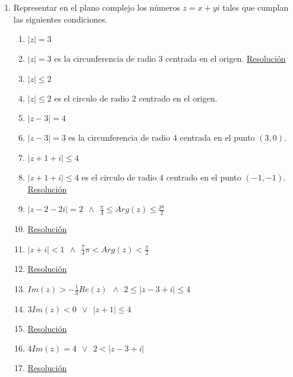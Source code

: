 \documentclass[a4paper]{article}
\newcommand{\answer}{\item[**]}
\newcommand{\exercise}{\item}
\newcommand{\df}[2]{\displaystyle\frac{#1}{#2}}
\begin{document}
\begin{enumerate}
\begin{enumerate} [label=(\alph*)]
		\item Dado $z=2e^{\beta i}$ y $w=1+i$, el argumento de $z.w$ será $\beta+\df{\pi}{4}$

		\item Si $z$ es un número real puro, entonces $z^2$ es un número real puro

	\end{enumerate}

	\exercise Representar en el plano complejo los números $z=x+yi$ tales que cumplan las siguientes condiciones.
	\begin{multicols}{2}
	\begin{enumerate} [label=(\alph*)]
		
		\item $|z|=3$
		\answer $|z|=3$ es la circunferencia de radio 3 centrada en el origen. \href{https://youtu.be/AQVEp9ncSwQ}{Resolución}

		\item $|z|\leq 2$
		\answer $|z|\leq 2$ es el circulo de radio 2 centrado en el origen.

		\item $|z-3| = 4$
		\answer $|z-3| = 3$ es la circunferencia de radio 4 centrada en el punto $(3,0)$.

		\item $|z+1+i| \leq 4$
		\answer $|z+1+i| \leq 4$ es el circulo de radio 4 centrado en el punto $(-1,-1)$. \href{https://youtu.be/Rj6VfY1fLzw}{Resolución}

		\item $|z-2-2i|=2 ~~\land~~ \df{\pi}{4} \leq Arg(z) \leq \df{pi}{2}$
		\answer \href{https://youtu.be/5OHpMCsd8iE}{Resolución}

		\item $|z+i|<1 ~~\land~~ \df{7}{4}\pi < Arg(z) < \df{\pi}{2}$
		\answer \href{https://youtu.be/OhXOvWcryMI}{Resolución}
		
		\item $Im(z)> -\df{1}{3}Re(z) ~~\land~~ 2 \leq |z-3+i| \leq 4$

		\item $3Im(z)<0 ~~\lor~~ |z+1| \leq 4$
		\answer \href{https://youtu.be/9pxsYXL6k88}{Resolución}

		\item $4Im(z)=4 ~~\lor~~ 2<|z-3+i|$
		\answer \href{https://youtu.be/3m1ZDSuXsX8}{Resolución}

	\end{enumerate}
	\end{multicols}


\end{enumerate}
\end{document}
